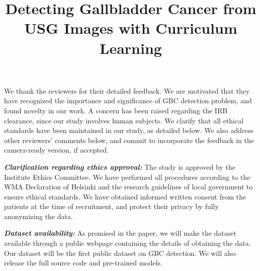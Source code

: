 \documentclass[10pt,twocolumn,letterpaper]{article}
\newcommand{\myfirstpara}[1]{\noindent \textbf{\textit{#1:}}}
\newcommand{\mypara}[1]{\vspace{0.1em} \myfirstpara{#1}}
\begin{document}

\title{Detecting Gallbladder Cancer from USG Images with Curriculum Learning}  %

\maketitle
\thispagestyle{empty}
\appendix

We thank the reviewers for their detailed feedback. We are motivated that they have recognized the importance and significance of GBC detection problem, and found novelty in our work. A concern has been raised regarding the IRB clearance, since our study involves human subjects. We clarify that all ethical standards have been maintained in our study, as detailed below. We also address other reviewers' comments below, and commit to incorporate the feedback in the camera-ready version, if accepted.

\mypara{Clarification regarding ethics approval}
%
The study is approved by the Institute Ethics Committee. We have performed all procedures according to the WMA Declaration of Helsinki and the research guidelines of local government to ensure ethical standards. We have obtained informed written consent from the patients at the time of recruitment, and protect their privacy by fully anonymizing the data. 

\mypara{Dataset availability}
%
As promised in the paper, we will make the dataset available through a public webpage containing the details of obtaining the data. Our dataset will be the first public dataset on GBC detection. We will also release the full source code and pre-trained models.
\end{document}

